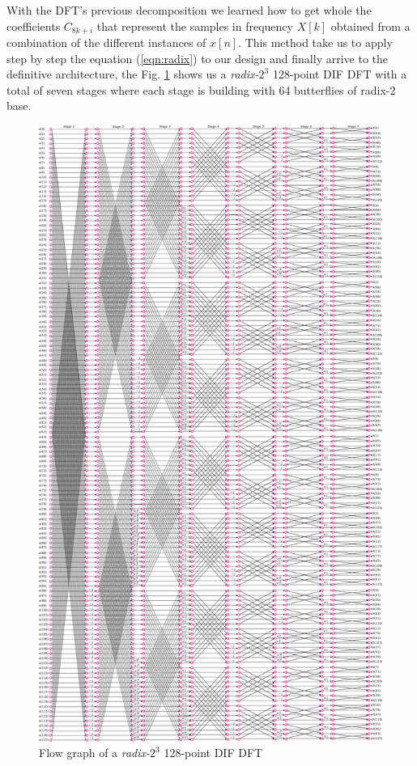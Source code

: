 \documentclass[journal,comsoc]{IEEEtran}
\begin{document}
With the DFT's previous decomposition we learned how to get whole the coefficients $C_{8k+i}$ that represent the samples in frequency $X[k]$ obtained from a combination of the different instances of $x[n]$. This method take us to apply step by step the equation (\ref{eqn:radix}) to our design and finally arrive to the definitive architecture, the Fig. \ref{fig:128puntosradix8conexion} shows us a \textit{radix-}$2^3$ 128-point DIF DFT with a total of seven stages where each stage is building with 64 butterflies of radix-2 base.
\begin{figure}[t!]
	\centering
	\includegraphics[width=\linewidth]{Diagramas/miSeccionFiguras/128PuntosRadix8Conexion.pdf}
	\caption{Flow graph of a \textit{radix-}$2^3$ 128-point DIF DFT}
	\label{fig:128puntosradix8conexion}
\end{figure}
\end{document}
